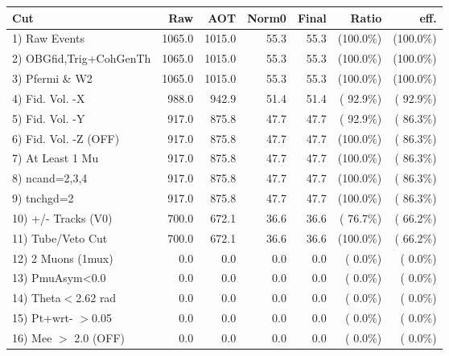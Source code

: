 \begin{table}[h!]\centering
 \begin{tabular}{||l||r|r|r|r|r|r||}
 \hline
 \hline
 Cut & Raw & AOT & Norm0 & Final & Ratio & eff.       \\
 \hline
  1) Raw Events           &       1065.0 &       1015.0 &         55.3 &         55.3 & (100.0\%) & (100.0\%) \\
  2) OBGfid,Trig+CohGenTh &       1065.0 &       1015.0 &         55.3 &         55.3 & (100.0\%) & (100.0\%) \\
  3) Pfermi \& W2         &       1065.0 &       1015.0 &         55.3 &         55.3 & (100.0\%) & (100.0\%) \\
  4) Fid. Vol. -X         &        988.0 &        942.9 &         51.4 &         51.4 & ( 92.9\%) & ( 92.9\%) \\
  5) Fid. Vol. -Y         &        917.0 &        875.8 &         47.7 &         47.7 & ( 92.9\%) & ( 86.3\%) \\
  6) Fid. Vol. -Z (OFF)   &        917.0 &        875.8 &         47.7 &         47.7 & (100.0\%) & ( 86.3\%) \\
  7) At Least 1 Mu        &        917.0 &        875.8 &         47.7 &         47.7 & (100.0\%) & ( 86.3\%) \\
  8) ncand=2,3,4          &        917.0 &        875.8 &         47.7 &         47.7 & (100.0\%) & ( 86.3\%) \\
  9) tnchgd=2             &        917.0 &        875.8 &         47.7 &         47.7 & (100.0\%) & ( 86.3\%) \\
 10) +/- Tracks (V0)      &        700.0 &        672.1 &         36.6 &         36.6 & ( 76.7\%) & ( 66.2\%) \\
 11) Tube/Veto Cut        &        700.0 &        672.1 &         36.6 &         36.6 & (100.0\%) & ( 66.2\%) \\
 12) 2 Muons (1mux)       &          0.0 &          0.0 &          0.0 &          0.0 & (  0.0\%) & (  0.0\%) \\
 13) PmuAsym<0.0          &          0.0 &          0.0 &          0.0 &          0.0 & (  0.0\%) & (  0.0\%) \\
 14) Theta$<$2.62 rad     &          0.0 &          0.0 &          0.0 &          0.0 & (  0.0\%) & (  0.0\%) \\
 15) Pt+wrt- $>$0.05      &          0.0 &          0.0 &          0.0 &          0.0 & (  0.0\%) & (  0.0\%) \\
 16) Mee $>$ 2.0  (OFF)   &          0.0 &          0.0 &          0.0 &          0.0 & (  0.0\%) & (  0.0\%) \\

\end{tabular}
\end{table}
